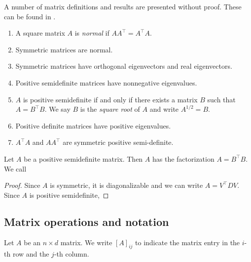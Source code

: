 A number of matrix definitions and results are presented without proof.
These can be found in \cite{horn2013matrix}.


\begin{enumerate}
    \item A square matrix \(A\) is \textit{normal} if \(AA^\top = A^\top A\).
    \item Symmetric matrices are normal.
    \item Symmetric matrices have orthogonal eigenvectors and real eigenvectors.
    \item Positive semidefinite matrices have nonnegative eigenvalues.
    \item \(A\) is positive semidefinite if and only if there exists a matrix \(B\) such that \(A = B^\top B\). We say \(B\) is the \textit{square root} of \(A\) and write \(A^{1/2} = B\).
    \item Positive definite matrices have positive eigenvalues.
    \item \(A^\top A\) and \(AA^\top\) are symmetric positive semi-definite.
\end{enumerate}

\begin{lemma}
    \label{lem:spsd-factorization}
    Let \(A\) be a positive semidefinite matrix.
    Then \(A\) has the factorization \(A = B^\top B\).
    We call \(\)
\end{lemma}
\begin{proof}
    Since \(A\) is symmetric, it is diagonalizable and we can write \(A = V^\top D V\).
    Since \(A\) is positive semidefinite, 
\end{proof}

\subsection{Matrix operations and notation}
\label{subsec:matrix-operations}

Let \(A\) be an \(n \times d\) matrix.
We write \([A]_{ij}\) to indicate the matrix entry in the \(i\)-th row and the \(j\)-th column.

